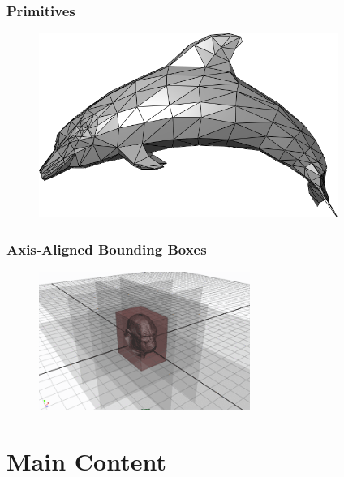 \documentclass{beamer}
\begin{document}
\begin{frame}
  \frametitle{Primitives}
\begin{figure}
\includegraphics[height=60mm]{Dolphin_triangle_mesh.png}
\end{figure}
\end{frame}

\begin{frame}
  \frametitle{Axis-Aligned Bounding Boxes}
\begin{figure}
\includegraphics[height=45mm]{aabb.png}
\end{figure}
\end{frame}

\section{Main Content}
\end{document}
